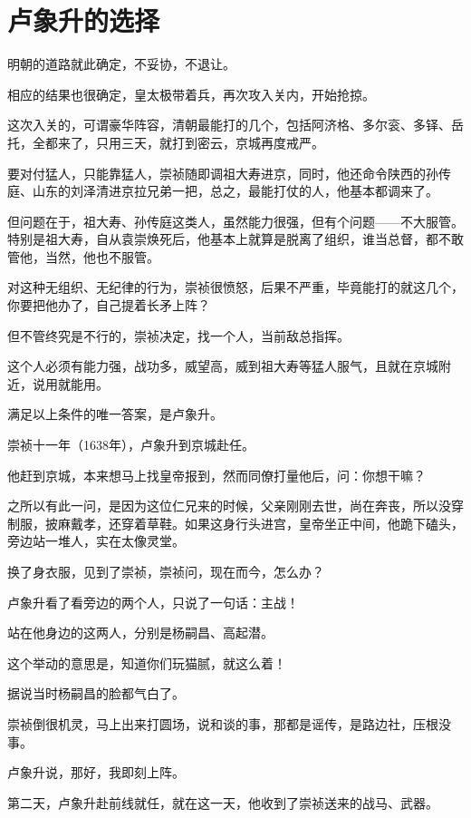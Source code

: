 \section{卢象升的选择}
\ifnum{}
	\begin{multicols}{\theparacolNo}
		\fi
		明朝的道路就此确定，不妥协，不退让。

		相应的结果也很确定，皇太极带着兵，再次攻入关内，开始抢掠。

		这次入关的，可谓豪华阵容，清朝最能打的几个，包括阿济格、多尔衮、多铎、岳托，全都来了，只用三天，就打到密云，京城再度戒严。

		要对付猛人，只能靠猛人，崇祯随即调祖大寿进京，同时，他还命令陕西的孙传庭、山东的刘泽清进京拉兄弟一把，总之，最能打仗的人，他基本都调来了。

		但问题在于，祖大寿、孙传庭这类人，虽然能力很强，但有个问题——不大服管。特别是祖大寿，自从袁崇焕死后，他基本上就算是脱离了组织，谁当总督，都不敢管他，当然，他也不服管。

		对这种无组织、无纪律的行为，崇祯很愤怒，后果不严重，毕竟能打的就这几个，你要把他办了，自己提着长矛上阵？

		但不管终究是不行的，崇祯决定，找一个人，当前敌总指挥。

		这个人必须有能力强，战功多，威望高，威到祖大寿等猛人服气，且就在京城附近，说用就能用。

		满足以上条件的唯一答案，是卢象升。

		崇祯十一年（1638年），卢象升到京城赴任。

		他赶到京城，本来想马上找皇帝报到，然而同僚打量他后，问：你想干嘛？

		之所以有此一问，是因为这位仁兄来的时候，父亲刚刚去世，尚在奔丧，所以没穿制服，披麻戴孝，还穿着草鞋。如果这身行头进宫，皇帝坐正中间，他跪下磕头，旁边站一堆人，实在太像灵堂。

		换了身衣服，见到了崇祯，崇祯问，现在而今，怎么办？

		卢象升看了看旁边的两个人，只说了一句话：主战！

		站在他身边的这两人，分别是杨嗣昌、高起潜。

		这个举动的意思是，知道你们玩猫腻，就这么着！

		据说当时杨嗣昌的脸都气白了。

		崇祯倒很机灵，马上出来打圆场，说和谈的事，那都是谣传，是路边社，压根没事。

		卢象升说，那好，我即刻上阵。

		第二天，卢象升赴前线就任，就在这一天，他收到了崇祯送来的战马、武器。


\end{multicols}
